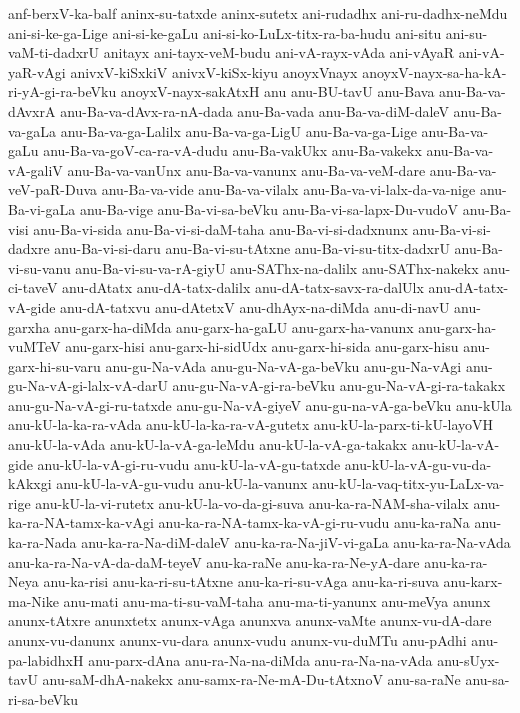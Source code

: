 {anf-berxV-ka-balf
aninx-su-tatxde
aninx-sutetx
ani-rudadhx
ani-ru-dadhx-neMdu
ani-si-ke-ga-Lige
ani-si-ke-gaLu
ani-si-ko-LuLx-titx-ra-ba-hudu
ani-situ
ani-su-vaM-ti-dadxrU
anitayx
ani-tayx-veM-budu
ani-vA-rayx-vAda
ani-vAyaR
ani-vA-yaR-vAgi
anivxV-kiSxkiV
anivxV-kiSx-kiyu
anoyxVnayx
anoyxV-nayx-sa-ha-kA-ri-yA-gi-ra-beVku
anoyxV-nayx-sakAtxH
anu
anu-BU-tavU
anu-Bava
anu-Ba-va-dAvxrA
anu-Ba-va-dAvx-ra-nA-dada
anu-Ba-vada
anu-Ba-va-diM-daleV
anu-Ba-va-gaLa
anu-Ba-va-ga-Lalilx
anu-Ba-va-ga-LigU
anu-Ba-va-ga-Lige
anu-Ba-va-gaLu
anu-Ba-va-goV-ca-ra-vA-dudu
anu-Ba-vakUkx
anu-Ba-vakekx
anu-Ba-va-vA-galiV
anu-Ba-va-vanUnx
anu-Ba-va-vanunx
anu-Ba-va-veM-dare
anu-Ba-va-veV-paR-Duva
anu-Ba-va-vide
anu-Ba-va-vilalx
anu-Ba-va-vi-lalx-da-va-nige
anu-Ba-vi-gaLa
anu-Ba-vige
anu-Ba-vi-sa-beVku
anu-Ba-vi-sa-lapx-Du-vudoV
anu-Ba-visi
anu-Ba-vi-sida
anu-Ba-vi-si-daM-taha
anu-Ba-vi-si-dadxnunx
anu-Ba-vi-si-dadxre
anu-Ba-vi-si-daru
anu-Ba-vi-su-tAtxne
anu-Ba-vi-su-titx-dadxrU
anu-Ba-vi-su-vanu
anu-Ba-vi-su-va-rA-giyU
anu-SAThx-na-dalilx
anu-SAThx-nakekx
anu-ci-taveV
anu-dAtatx
anu-dA-tatx-dalilx
anu-dA-tatx-savx-ra-dalUlx
anu-dA-tatx-vA-gide
anu-dA-tatxvu
anu-dAtetxV
anu-dhAyx-na-diMda
anu-di-navU
anu-garxha
anu-garx-ha-diMda
anu-garx-ha-gaLU
anu-garx-ha-vanunx
anu-garx-ha-vuMTeV
anu-garx-hisi
anu-garx-hi-sidUdx
anu-garx-hi-sida
anu-garx-hisu
anu-garx-hi-su-varu
anu-gu-Na-vAda
anu-gu-Na-vA-ga-beVku
anu-gu-Na-vAgi
anu-gu-Na-vA-gi-lalx-vA-darU
anu-gu-Na-vA-gi-ra-beVku
anu-gu-Na-vA-gi-ra-takakx
anu-gu-Na-vA-gi-ru-tatxde
anu-gu-Na-vA-giyeV
anu-gu-na-vA-ga-beVku
anu-kUla
anu-kU-la-ka-ra-vAda
anu-kU-la-ka-ra-vA-gutetx
anu-kU-la-parx-ti-kU-layoVH
anu-kU-la-vAda
anu-kU-la-vA-ga-leMdu
anu-kU-la-vA-ga-takakx
anu-kU-la-vA-gide
anu-kU-la-vA-gi-ru-vudu
anu-kU-la-vA-gu-tatxde
anu-kU-la-vA-gu-vu-da-kAkxgi
anu-kU-la-vA-gu-vudu
anu-kU-la-vanunx
anu-kU-la-vaq-titx-yu-LaLx-va-rige
anu-kU-la-vi-rutetx
anu-kU-la-vo-da-gi-suva
anu-ka-ra-NAM-sha-vilalx
anu-ka-ra-NA-tamx-ka-vAgi
anu-ka-ra-NA-tamx-ka-vA-gi-ru-vudu
anu-ka-raNa
anu-ka-ra-Nada
anu-ka-ra-Na-diM-daleV
anu-ka-ra-Na-jiV-vi-gaLa
anu-ka-ra-Na-vAda
anu-ka-ra-Na-vA-da-daM-teyeV
anu-ka-raNe
anu-ka-ra-Ne-yA-dare
anu-ka-ra-Neya
anu-ka-risi
anu-ka-ri-su-tAtxne
anu-ka-ri-su-vAga
anu-ka-ri-suva
anu-karx-ma-Nike
anu-mati
anu-ma-ti-su-vaM-taha
anu-ma-ti-yanunx
anu-meVya
anunx
anunx-tAtxre
anunxtetx
anunx-vAga
anunxva
anunx-vaMte
anunx-vu-dA-dare
anunx-vu-danunx
anunx-vu-dara
anunx-vudu
anunx-vu-duMTu
anu-pAdhi
anu-pa-labidhxH
anu-parx-dAna
anu-ra-Na-na-diMda
anu-ra-Na-na-vAda
anu-sUyx-tavU
anu-saM-dhA-nakekx
anu-samx-ra-Ne-mA-Du-tAtxnoV
anu-sa-raNe
anu-sa-ri-sa-beVku
}
